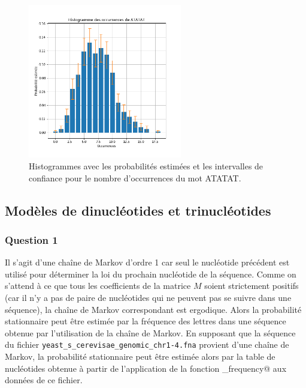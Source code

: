 \documentclass[a4paper,12pt]{article}
\begin{document}
\begin{figure}
\centering
\includegraphics[width=0.6\textwidth]{Figures/histogramme_ATATAT_errorbar.png}
\caption{Histogrammes avec les probabilités estimées et les intervalles de confiance pour le nombre d'occurrences du mot ATATAT.}
\label{FigHistogrammeErrorBar}
\end{figure}

\subsection{Modèles de dinucléotides et trinucléotides}
\label{SecMarkov}

\subsubsection*{Question 1}

Il s'agit d'une chaîne de Markov d'ordre 1 car seul le nucléotide précédent est utilisé pour déterminer la loi du prochain nucléotide de la séquence. Comme on s'attend à ce que tous les coefficients de la matrice $M$ soient strictement positifs (car il n'y a pas de paire de nucléotides qui ne peuvent pas se suivre dans une séquence), la chaîne de Markov correspondant est ergodique. Alors la probabilité stationnaire peut être estimée par la fréquence des lettres dans une séquence obtenue par l'utilisation de la chaîne de Markov. En supposant que la séquence du fichier \texttt{yeast\_\allowbreak{}s\_\allowbreak{}cerevisae\_\allowbreak{}genomic\_\allowbreak{}chr1-4\allowbreak{}.fna} provient d'une chaîne de Markov, la probabilité stationnaire peut être estimée alors par la table de nucléotides obtenue à partir de l'application de la fonction \verb@nucleotide_frequency@ aux données de ce fichier.
\end{document}
